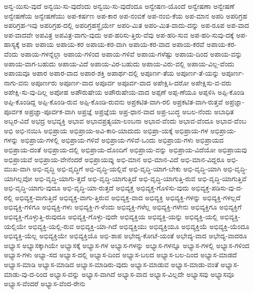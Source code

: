 {ಅನ್ವ-ಯಿಸು-ವುದೆ
ಅನ್ವಯಿ-ಸು-ವುದೆಂದು
ಅನ್ವಯಿ-ಸು-ವುದೆಂದೂ
ಅನ್ವೇಷಣ-ಯೊಂದೆ
ಅನ್ವೇಷಣಾ
ಅನ್ವೇಷಣೆ
ಅನ್ವೇಷಣೆಯ
ಅನ್ವೇಷಣೆಯು
ಅಪ-ಕರ್ಷಣ
ಅಪ-ಕಾರ
ಅಪ-ನಂಬಿಕೆ
ಅಪ-ನಂಬಿ-ಕೆಯ
ಅಪ-ಮಾನ
ಅಪರಿ
ಅಪರಿಗ್ರಹ
ಅಪರಿಗ್ರಹ-ಇವು
ಅಪರಿಗ್ರಹ-ದಲ್ಲಿ
ಅಪರಿಗ್ರಹಸ್ಥೈರ್ಯೇ
ಅಪರಿ-ಮಿತ
ಅಪರಿ-ಮಿತ-ವಾದು-ದನ್ನು
ಅಪ-ರೂಪ
ಅಪ-ವಾದ
ಅಪ-ವಾದವೇ
ಅಪವಿತ್ರ
ಅಪವಿತ್ರ-ವಾಗು-ವುದು
ಅಪ-ಹರಿಸು-ತ್ತಿರು-ವೆವು
ಅಪ-ಹರಿ-ಸುವ
ಅಪ-ಹರಿ-ಸುವು-ದಕ್ಕೆ
ಅಪ-ಹಾಸ್ಯಕ್ಕೆ
ಅಪಾ
ಅಪಾಯ
ಅಪಾಯ-ಕರ
ಅಪಾಯ-ಕರ-ವಾಗಿ
ಅಪಾಯ-ಕರ-ವಾದ
ಅಪಾಯ-ಕರವೆ
ಅಪಾಯ-ಕರ-ವೆಂದು
ಅಪಾಯ-ಗಳನ್ನೆಲ್ಲಾ
ಅಪಾಯ-ಗಳಿಂದ
ಅಪಾಯ-ಗಳಿವೆ
ಅಪಾಯ-ಗಳೆಷ್ಟು
ಅಪಾಯ-ದಿಂದ
ಅಪಾಯ-ವನ್ನು
ಅಪಾಯ-ವಾಗ-ಬಹುದು
ಅಪಾಯ-ವಿದೆ
ಅಪಾಯ-ವಿರ-ಬಹುದು
ಅಪಾಯ-ವಿರು-ವಲ್ಲಿ
ಅಪಾಯ-ವಿಲ್ಲ-ವೆಂದು
ಅಪಾಯವೂ
ಅಪಾರ
ಅಪಾರ-ವಾದ
ಅಪಾರ-ಶಕ್ತಿ
ಅಪಾರ್ಥ-ದಲ್ಲಿ
ಅಪೂರ್ಣ-ತೆಯ
ಅಪೂರ್ಣ-ತೆ-ಯನ್ನು
ಅಪೂರ್ಣ-ನಾಗು-ವನು
ಅಪೂರ್ಣರು
ಅಪೂರ್ಣ-ವಾದ
ಅಪೂರ್ವ
ಅಪೂರ್ವ-ವಾದ
ಅಪೇಕ್ಷಿಸಿ-ದರೋ
ಅಪೇಕ್ಷಿಸು-ವ-ವರು
ಅಪೇಕ್ಷಿ-ಸು-ವು-ದಿಲ್ಲ
ಅಪೋಹ
ಅಪೌರುಷೇಯ
ಅಪೌರುಷೇಯ-ವಾದ
ಅಪ್ಪಣೆ
ಅಪ್ಪ-ಣೆಯೂ
ಅಪ್ಪಳಿಸಿ
ಅಪ್ಪಿ-ಕೊಂಡಿ
ಅಪ್ಪಿ-ಕೊಂಡಿದ್ದ
ಅಪ್ಪಿ-ಕೊಂಡಿ-ರುವ
ಅಪ್ಪಿ-ಕೊಂಡಿ-ರುವನು
ಅಪ್ರಕಟಿತ-ವಾಗಿ-ರಲಿ
ಅಪ್ರಕಟಿತ-ವಾಗಿ-ರುತ್ತವೆ
ಅಪ್ರಜ್ಞಾ-ಪೂರ್ವಕ
ಅಪ್ರಜ್ಞಾ-ಪೂರ್ವಕ-ವಾಗಿ
ಅಪ್ರಜ್ಞೆ
ಅಪ್ರಜ್ಞೆಯ
ಅಪ್ರ-ಧಾನ-ವಾದ
ಅಪ್ರ-ಬುದ್ಧ
ಅಬಲ-ನೆಂದು
ಅಬಾಧಿತ
ಅಬ್ಬರ-ವಿದೆ
ಅಭದ್ರ
ಅಭವ್ಯಕ್ತಿ
ಅಭಾವ
ಅಭಾವಪ್ರತ್ಯಯಾ-ಲಂಬನಾ
ಅಭಾವ-ವೆಂದು
ಅಭಾವ-ವೆಂದೂ
ಅಭಾವ-ವೆಂಬ
ಅಭಿ
ಅಭಿ-ನಯಿಸಿ
ಅಭಿಪ್ರಾಯ
ಅಭಿಪ್ರಾಯ-ಅವಿ-ಕಾರಿ-ಯಾದುದು
ಅಭಿಪ್ರಾ-ಯಕ್ಕೆ
ಅಭಿಪ್ರಾಯ-ಗಳ
ಅಭಿಪ್ರಾಯ-ಗಳನ್ನು
ಅಭಿಪ್ರಾಯ-ಗಳಲ್ಲಿ
ಅಭಿಪ್ರಾಯ-ಗಳಿವೆ
ಅಭಿಪ್ರಾಯ-ಗಳಿವೆ-ಒಂದು
ಅಭಿಪ್ರಾಯ-ಗಳು
ಅಭಿಪ್ರಾಯದ
ಅಭಿಪ್ರಾಯ-ದಂತೆ
ಅಭಿಪ್ರಾಯ-ದಲ್ಲಿ
ಅಭಿಪ್ರಾಯ-ದೊಂದಿಗೆ
ಅಭಿಪ್ರಾಯ-ವನ್ನು
ಅಭಿಪ್ರಾಯ-ವಿದೆಯೋ
ಅಭಿಪ್ರಾಯವು
ಅಭಿಪ್ರಾಯವೆ
ಅಭಿಪ್ರಾಯ-ವೇನೆಂದರೆ
ಅಭಿಪ್ರಾಯವ್ಕು
ಅಭಿ-ಮಾನ
ಅಭಿ-ಮಾನ-ವಿದೆ
ಅಭಿ-ಮಾನ-ವಿದ್ದರೂ
ಅಭಿ-ಮುಖ-ವಾಗಿ
ಅಭಿ-ವೃದ್ಧಿ
ಅಭಿ-ವೃದ್ಧಿಗೆ
ಅಭಿ-ವೃದ್ಧಿ-ಯಲ್ಲಿವೆ
ಅಭಿ-ವೃದ್ಧಿ-ಯಾಗ-ಬೇಕು
ಅಭಿ-ವೃದ್ಧಿ-ಯಾಗಿ
ಅಭಿ-ವೃದ್ಧಿ-ಯಾಗಿಲ್ಲವೋ
ಅಭಿ-ವೃದ್ಧಿ-ಯಾಗು-ತ್ತದೆ
ಅಭಿ-ವೃದ್ಧಿ-ಯಾಗುತ್ತಿದೆ
ಅಭಿ-ವೃದ್ಧಿ-ಯಾಗುತ್ತಿ-ರುವ
ಅಭಿ-ವೃದ್ಧಿ-ಯಾಗುತ್ತಿವೆ
ಅಭಿ-ವೃದ್ಧಿ-ಯಾಗು-ವುದೂ
ಅಭಿ-ವೃದ್ಧಿ-ಯಾ-ರುತ್ತದೆ
ಅಭಿವ್ಯಕ್ತ
ಅಭಿವ್ಯಕ್ತ-ಗೊಳಿಸು-ವುದು
ಅಭಿವ್ಯಕ್ತ-ಪಡಿಸು-ವು-ದ-ರಲ್ಲಿ
ಅಭಿವ್ಯಕ್ತ-ವಾಗುತ್ತಿದೆ
ಅಭಿವ್ಯಕ್ತ-ವಾಗು-ತ್ತಿರುವ
ಅಭಿವ್ಯಕ್ತ-ವಾದ
ಅಭಿವ್ಯಕ್ತಿ
ಅಭಿವ್ಯಕ್ತಿ-ಗಳನ್ನು
ಅಭಿವ್ಯಕ್ತಿ-ಗಳಲ್ಲದೆ
ಅಭಿವ್ಯಕ್ತಿ-ಗಳಿಗೂ
ಅಭಿವ್ಯಕ್ತಿ-ಗಳು
ಅಭಿವ್ಯಕ್ತಿ-ಗ-ಳೆಂದು
ಅಭಿವ್ಯಕ್ತಿ-ಗಳೆಲ್ಲ
ಅಭಿವ್ಯಕ್ತಿ-ಗಳೇನು
ಅಭಿವ್ಯಕ್ತಿಗೂ
ಅಭಿವ್ಯಕ್ತಿಗೆ
ಅಭಿವ್ಯಕ್ತಿ-ಗೊಳ್ಳುತ್ತಿ-ರುವುದೂ
ಅಭಿವ್ಯಕ್ತಿ-ಗೊಳ್ಳು-ವುದೇ
ಅಭಿವ್ಯಕ್ತಿಯ
ಅಭಿವ್ಯಕ್ತಿ-ಯನ್ನು
ಅಭಿವ್ಯಕ್ತಿ-ಯಲ್ಲಿ
ಅಭಿವ್ಯಕ್ತಿ-ಯಲ್ಲಿಯೇ
ಅಭಿವ್ಯಕ್ತಿ-ಯಲ್ಲಿ-ರುವ
ಅಭಿವ್ಯಕ್ತಿ-ಯಾ-ಗಿದೆ
ಅಭಿವ್ಯಕ್ತಿಯು
ಅಭಿವ್ಯಕ್ತಿಯೂ
ಅಭಿವ್ಯಕ್ತಿಯೆ
ಅಭಿವ್ಯಕ್ತಿ-ಯೆಂದೂ
ಅಭಿವ್ಯಕ್ತಿ-ಯೆಲ್ಲ
ಅಭಿವ್ಯಕ್ತಿಯೇ
ಅಭಿವ್ಯಕ್ತಿಯೊ
ಅಭಿ-ಶಾಪ
ಅಭೇದ್ಯ-ಕೋಟೆ-ಯಂತೆ
ಅಭೇದ್ಯ-ವಾದ
ಅಭೇದ್ಯ-ವಾದರೂ
ಅಭ್ಯಾಸ
ಅಭ್ಯಾಸಕ್ಕಾಗಿಯೇ
ಅಭ್ಯಾಸಕ್ಕೆ
ಅಭ್ಯಾಸ-ಗಳ
ಅಭ್ಯಾಸ-ಗಳನ್ನು
ಅಭ್ಯಾಸ-ಗಳನ್ನೂ
ಅಭ್ಯಾಸ-ಗಳಲ್ಲಿ
ಅಭ್ಯಾಸ-ಗಳಿಂದ
ಅಭ್ಯಾಸ-ಗಳು
ಅಭ್ಯಾ-ಸದ
ಅಭ್ಯಾಸ-ದಲ್ಲಿ
ಅಭ್ಯಾಸ-ದಿಂದ
ಅಭ್ಯಾಸ-ಬಲದ
ಅಭ್ಯಾಸ-ಬಲ-ದಿಂದ
ಅಭ್ಯಾಸ-ಮಾಡದೆ
ಅಭ್ಯಾಸ-ಮಾಡಿ
ಅಭ್ಯಾಸ-ಮಾಡಿದ
ಅಭ್ಯಾಸ-ಮಾಡಿರು-ವುದು
ಅಭ್ಯಾಸ-ಮಾಡುವ
ಅಭ್ಯಾಸ-ಮಾಡು-ವಂತೆ
ಅಭ್ಯಾಸ-ಮಾಡು-ವು-ದ-ರಿಂದ
ಅಭ್ಯಾಸ-ವನ್ನು
ಅಭ್ಯಾಸ-ವಾಗಿದೆ
ಅಭ್ಯಾಸ-ವಾದ
ಅಭ್ಯಾಸ-ವಿಲ್ಲದೇ
ಅಭ್ಯಾಸವು
ಅಭ್ಯಾಸವೂ
ಅಭ್ಯಾಸ-ವೆಂದರೆ
ಅಭ್ಯಾಸ-ವೆಂದ-ರೇನು
}
